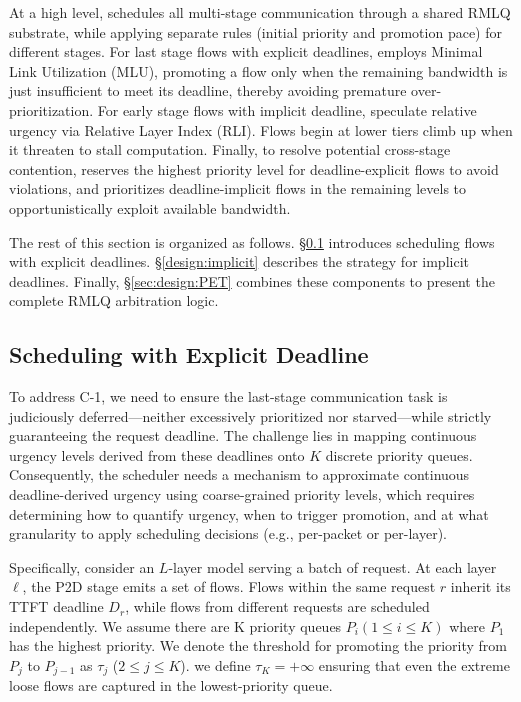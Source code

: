 At a high level, \sys{} schedules all multi-stage communication through a shared RMLQ substrate, while applying separate rules (initial priority and promotion pace) for different stages. For last stage flows with explicit deadlines, \sys employs Minimal Link Utilization (MLU), promoting a flow only when the remaining bandwidth is just insufficient to meet its deadline, thereby avoiding premature over-prioritization. For early stage flows with implicit deadline, \sys speculate relative urgency via Relative Layer Index (RLI). Flows begin at lower tiers climb up when it threaten to stall computation. Finally, to resolve potential cross-stage contention, \sys{} reserves the highest priority level for deadline-explicit flows to avoid violations, and prioritizes deadline-implicit flows in the remaining levels to opportunistically exploit available bandwidth.

The rest of this section is organized as follows. \S\ref{design:explicit} introduces scheduling flows with explicit deadlines. \S\ref{design:implicit} describes the strategy for implicit deadlines. Finally, \S\ref{sec:design:PET} combines these components to present the complete RMLQ arbitration logic.

\subsection{Scheduling with Explicit Deadline}\label{design:explicit}

To address C-1, we need to ensure the last-stage communication task is judiciously deferred—neither excessively prioritized nor starved—while strictly guaranteeing the request deadline. The challenge lies in mapping continuous urgency levels derived from these deadlines onto $K$ discrete priority queues. Consequently, the scheduler needs a mechanism to approximate continuous deadline-derived urgency using coarse-grained priority levels, which requires determining how to quantify urgency, when to trigger promotion, and at what granularity to apply scheduling decisions (e.g., per-packet or per-layer).

Specifically, consider an $L$-layer model serving a batch of request. At each layer $\ell$, the P2D stage emits a set of flows. Flows within the same request $r$ inherit its TTFT deadline $D_r$, while flows from different requests are scheduled independently. We assume there are K priority queues $P_i(1\leq i \leq K)$ where $P_1$ has the highest priority. We denote the threshold for promoting the priority from $P_{j}$ to $P_{j-1}$ as $\tau_{j}$ ($2 \le j \le K$). we define $\tau_K = +\infty$ ensuring that even the extreme loose flows are captured in the lowest-priority queue.

